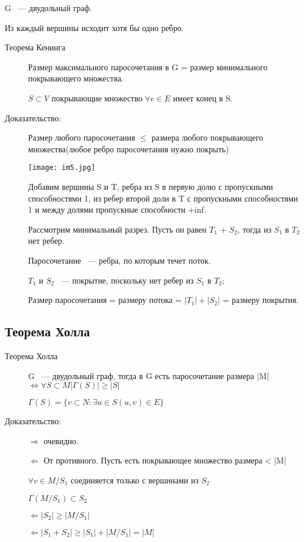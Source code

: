 \documentclass[12pt]{article}
\begin{document}
G ~--- двудольный граф.

Из каждый вершины исходит хотя бы одно ребро.

\begin{description}
\item[Теорема Кенинга] Размер максимального паросочетания в G = размер минимального покрывающего множества. 

$S \subset V$ покрывающие множество $\forall e \in E$ имеет конец в S.

\item[Доказательство:] Размер любого паросочетания $\le$ размера любого покрывающего множества(любое ребро паросочетания нужно покрыть)

\begin{center} 
\texttt{[image: im5.jpg]} 
\end{center}



Добавим вершины S и T, ребра из S в первую долю с пропускными способностями 1, из ребер второй доли в T с пропускными способностями 1 и между долями пропускные способности +inf.

Рассмотрим минимальный разрез. Пусть он равен $T_1$ + $S_2$, тогда из $S_1$ в $T_2$ нет ребер. 

Паросочетание ~--- ребра, по которым течет поток. 

 $T_1$ и $S_2$ ~--- покрытие, поскольку нет ребер из $S_1$ в $T_2$;


Размер паросочетания = размеру потока = $|T_1|+| S_2|$ = размеру покрытия.

\end{description}

\subsection{Теорема Холла}

\begin{description}
\item [Теорема Холла] G ~--- двудольный граф, тогда в G есть паросочетание размера |M| $\Leftrightarrow \forall S \subset M |\Gamma (S)| \ge |S|$

$\Gamma(S) = \{v \subset N: \exists u \in S (u, v) \in E\}$

\item[Доказательство:] 

$\Rightarrow$ очевидно.

$\Leftarrow$ От противного. Пусть есть покрывающее множество размера < |M|

$\forall v \in M/S_1$ соединяется только с вершинами из $S_2$ 

$\Gamma (M/S_1) \subset S_2$

$\Leftarrow |S_2| \ge |M/S_1|$

$\Leftarrow |S_1 + S_2| \ge |S_1| + |M/S_1| = |M|$


\end{description}
\end{document}
